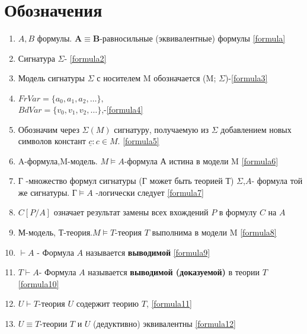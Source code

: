 \section*{Обозначения}
\begin{enumerate}
	\item $A,B$ формулы. {$\boldsymbol{A}\equiv \boldsymbol{B}$}-равносильные (эквивалентные) формулы \ref{formula}
	\item Сигнатура $\Sigma$- \ref{formula2}
	\item Модель сигнатуры $\varSigma $ с носителем M обозначается (M; $\varSigma$)-\ref{formula3}
	\item $ FrVar = \{a_{0}, a_{1}, a_{2}, \ldots \},$\\
		$ BdVar = \{v_{0}, v_{1},v_{2}, \ldots \}$,-\ref{formula4}
	\item Обозначим через $ \Sigma(M)$ сигнатуру, получаемую из $  \Sigma$ добавлением новых символов констант
		${\underline {c} : c \in M.  } $ \ref{formula5}
	\item A-формула,M-модель. $ M \vDash A $-формула А истина в модели M \ref{formula6}
	\item Г -множество формул сигнатуры (Г может быть теорией Т) $\Sigma$,$A$- формула той же сигнатуры.
		$\text{Г}\vDash A$ -логически следует \ref{formula7}
	\item $C[P/A]$ означает результат замены всех вхождений $P$ в формулу $C$ на $A$
	\item М-модель, Т-теория.$M\vDash T$-теория $T$ выполнима в модели M \ref{formula8}
	\item $\vdash A$ - Формула $A$ называется \textbf{выводимой} \ref{formula9}
	\item $T \vdash A$- Формула $A$ называется \textbf{выводимой (доказуемой)} в теории $T$ \ref{formula10}
	\item $U \vdash T$-теория $U$ содержит теорию $T$, \ref{formula11}
	\item $U \equiv T$-теории $T$ и $U$ (дедуктивно) эквивалентны \ref{formula12}
\end{enumerate}

